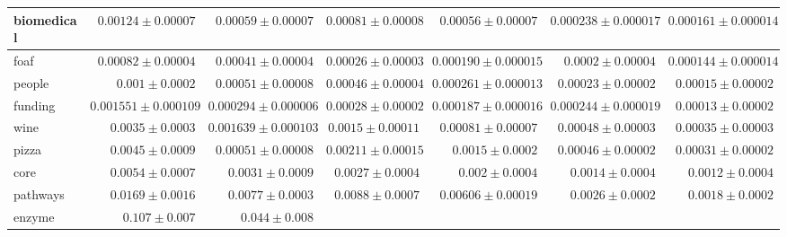 \begin{landscape}
\begin{table}[]
{\begin{tabular}{|l|rrrrrr|}
biomedical &
  \multicolumn{1}{r|}{$0.00124 \pm 0.00007$} &
  \multicolumn{1}{r|}{$0.00059 \pm 0.00007$} &
  \multicolumn{1}{r|}{$0.00081 \pm 0.00008$} &
  \multicolumn{1}{r|}{$0.00056 \pm 0.00007$} &
  \multicolumn{1}{r|}{$0.000238 \pm 0.000017$} &
  $0.000161 \pm 0.000014$ \\ \hline
foaf &
  \multicolumn{1}{r|}{$0.00082 \pm 0.00004$} &
  \multicolumn{1}{r|}{$0.00041 \pm 0.00004$} &
  \multicolumn{1}{r|}{$0.00026 \pm 0.00003$} &
  \multicolumn{1}{r|}{$0.000190 \pm 0.000015$} &
  \multicolumn{1}{r|}{$0.0002 \pm 0.00004$} &
  $0.000144 \pm 0.000014$ \\ \hline
people &
  \multicolumn{1}{r|}{$0.001 \pm 0.0002$} &
  \multicolumn{1}{r|}{$0.00051 \pm 0.00008$} &
  \multicolumn{1}{r|}{$0.00046 \pm 0.00004$} &
  \multicolumn{1}{r|}{$0.000261 \pm 0.000013$} &
  \multicolumn{1}{r|}{$0.00023 \pm 0.00002$} &
  $0.00015 \pm 0.00002$ \\ \hline
funding &
  \multicolumn{1}{r|}{$0.001551 \pm 0.000109$} &
  \multicolumn{1}{r|}{$0.000294 \pm 0.000006$} &
  \multicolumn{1}{r|}{$0.00028 \pm 0.00002$} &
  \multicolumn{1}{r|}{$0.000187 \pm 0.000016$} &
  \multicolumn{1}{r|}{$0.000244 \pm 0.000019$} &
  $0.00013 \pm 0.00002$ \\ \hline
wine &
  \multicolumn{1}{r|}{$0.0035 \pm 0.0003$} &
  \multicolumn{1}{r|}{$0.001639 \pm 0.000103$} &
  \multicolumn{1}{r|}{$0.0015 \pm 0.00011$} &
  \multicolumn{1}{r|}{$0.00081 \pm 0.00007$} &
  \multicolumn{1}{r|}{$0.00048 \pm 0.00003$} &
  $0.00035 \pm 0.00003$ \\ \hline
pizza &
  \multicolumn{1}{r|}{$0.0045 \pm 0.0009$} &
  \multicolumn{1}{r|}{$0.00051 \pm 0.00008$} &
  \multicolumn{1}{r|}{$0.00211 \pm 0.00015$} &
  \multicolumn{1}{r|}{$0.0015 \pm 0.0002$} &
  \multicolumn{1}{r|}{$0.00046 \pm 0.00002$} &
  $0.00031 \pm 0.00002$ \\ \hline
core &
  \multicolumn{1}{r|}{$0.0054 \pm 0.0007$} &
  \multicolumn{1}{r|}{$0.0031 \pm 0.0009$} &
  \multicolumn{1}{r|}{$0.0027 \pm 0.0004$} &
  \multicolumn{1}{r|}{$0.002 \pm 0.0004$} &
  \multicolumn{1}{r|}{$0.0014 \pm 0.0004$} &
  $0.0012 \pm 0.0004$ \\ \hline
pathways &
  \multicolumn{1}{r|}{$0.0169 \pm 0.0016$} &
  \multicolumn{1}{r|}{$0.0077 \pm 0.0003$} &
  \multicolumn{1}{r|}{$0.0088 \pm 0.0007$} &
  \multicolumn{1}{r|}{$0.00606 \pm 0.00019$} &
  \multicolumn{1}{r|}{$0.0026 \pm 0.0002$} &
  $0.0018 \pm 0.0002$ \\ \hline
enzyme &
  \multicolumn{1}{r|}{$0.107 \pm 0.007$} &
  \multicolumn{1}{r|}{$0.044 \pm 0.008$} &

\end{tabular}}
\end{table}
\end{landscape}
